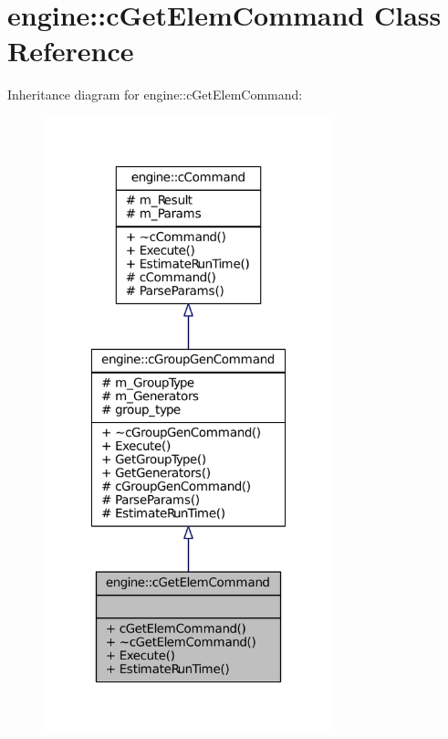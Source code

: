 \hypertarget{classengine_1_1cGetElemCommand}{
\section{engine\-:\-:c\-Get\-Elem\-Command \-Class \-Reference}
\label{classengine_1_1cGetElemCommand}
}


\-Inheritance diagram for engine\-:\-:c\-Get\-Elem\-Command\-:\nopagebreak
\begin{figure}[H]
\begin{center}
\leavevmode
\includegraphics[width=238pt]{classengine_1_1cGetElemCommand__inherit__graph}
\end{center}
\end{figure}


